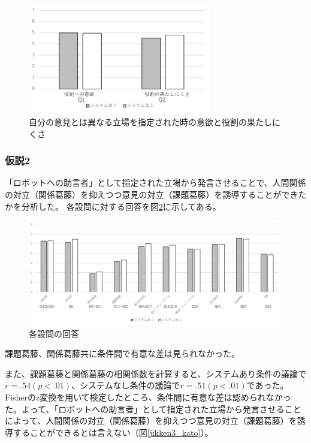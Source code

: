 \documentclass[11pt, a4paper]{jreport} %
\begin{document}
\begin{figure}[htbp]
\begin{center}
\includegraphics[width=80mm]{images/jikken3_iyoku.png}
\caption{自分の意見とは異なる立場を指定された時の意欲と役割の果たしにくさ}
\label{fig:jikken3_iyoku}
\end{center}
\end{figure}


\subsubsection*{仮説2}
「ロボットへの助言者」として指定された立場から発言させることで、人間関係の対立（関係葛藤）を抑えつつ意見の対立（課題葛藤）を誘導することができたかを分析した。
各設問に対する回答を図\ref{fig:jikken3_situ}に示してある。
\begin{figure}[htbp]
\begin{center}
\includegraphics[width=150mm]{images/jikken3_situ.png}
\caption{各設問の回答}
\label{fig:jikken3_situ}
\end{center}
\end{figure}

課題葛藤、関係葛藤共に条件間で有意な差は見られなかった。%

また、課題葛藤と関係葛藤の相関係数を計算すると、システムあり条件の議論で$r=.54 (p<.01)$、システムなし条件の議論で$r=.51 (p<.01)$であった。Fisherのz変換を用いて検定したところ、条件間に有意な差は認められなかった。よって、「ロボットへの助言者」として指定された立場から発言させることによって、人間関係の対立（関係葛藤）を抑えつつ意見の対立（課題葛藤）を誘導することができるとは言えない（図\ref{jikken3_kato}）。
\end{document}

